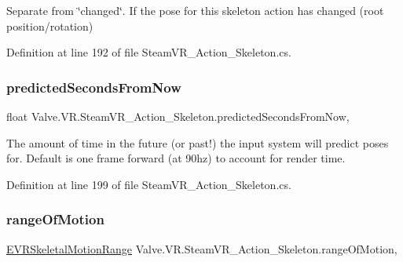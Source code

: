 Separate from \char`\"{}changed\char`\"{}. If the pose for this skeleton action has changed (root position/rotation) 



Definition at line 192 of file Steam\+V\+R\+\_\+\+Action\+\_\+\+Skeleton.\+cs.

\mbox{\label{class_valve_1_1_v_r_1_1_steam_v_r___action___skeleton_aa98e59c1530944c5e570a8de8b430c65}} 
\subsubsection{\texorpdfstring{predictedSecondsFromNow}{predictedSecondsFromNow}}
{\footnotesize\ttfamily float Valve.\+V\+R.\+Steam\+V\+R\+\_\+\+Action\+\_\+\+Skeleton.\+predicted\+Seconds\+From\+Now\hspace{0.3cm}{\ttfamily [get]}, {\ttfamily [set]}}



The amount of time in the future (or past!) the input system will predict poses for. Default is one frame forward (at 90hz) to account for render time. 



Definition at line 199 of file Steam\+V\+R\+\_\+\+Action\+\_\+\+Skeleton.\+cs.

\mbox{\label{class_valve_1_1_v_r_1_1_steam_v_r___action___skeleton_a51d29eb0cba3a7b9d50da1b8e1ea4635}} 
\subsubsection{\texorpdfstring{rangeOfMotion}{rangeOfMotion}}
{\footnotesize\ttfamily \mbox{\hyperlink{namespace_valve_1_1_v_r_affc8d18345f8f5d36f1ae7b4ce534500}{E\+V\+R\+Skeletal\+Motion\+Range}} Valve.\+V\+R.\+Steam\+V\+R\+\_\+\+Action\+\_\+\+Skeleton.\+range\+Of\+Motion\hspace{0.3cm}{\ttfamily [get]}, {\ttfamily [set]}}



